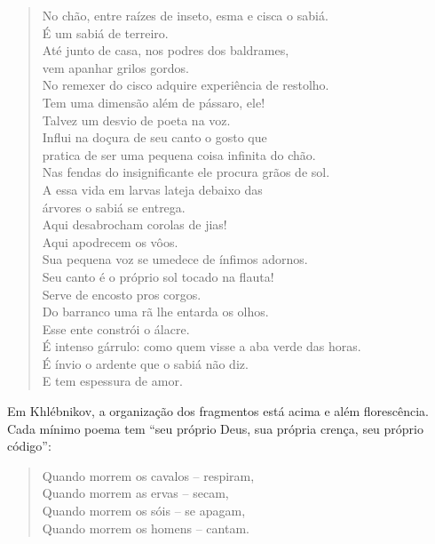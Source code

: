 \begin{verse}
No chão, entre raízes de inseto, esma e cisca \qb{}o sabiá. \\
É um sabiá de terreiro. \\
Até junto de casa, nos podres dos baldrames, \\
vem apanhar grilos gordos. \\
No remexer do cisco adquire experiência de \qb{}restolho. \\
Tem uma dimensão além de pássaro, ele! \\
Talvez um desvio de poeta na voz. \\
Influi na doçura de seu canto o gosto que \\
pratica de ser uma pequena coisa \qb{}infinita do chão. \\
Nas fendas do insignificante ele procura \qb{}grãos de sol. \\
A essa vida em larvas lateja debaixo das \\
árvores o sabiá se entrega. \\
Aqui desabrocham corolas de jias! \\
Aqui apodrecem os vôos. \\
Sua pequena voz se umedece de ínfimos \qb{}adornos. \\
Seu canto é o próprio sol tocado na flauta! \\
Serve de encosto pros corgos. \\
Do barranco uma rã lhe entarda os olhos. \\
Esse ente constrói o álacre. \\
É intenso gárrulo: como quem visse a aba \qb{}verde das horas. \\
É ínvio o ardente que o sabiá não diz. \\
E tem espessura de amor.
\end{verse}

Em Khlébnikov, a organização dos fragmentos está acima e além
florescência. Cada mínimo poema tem ``seu próprio Deus, sua própria
crença, seu próprio código'':

\begin{verse}
Quando morrem os cavalos -- respiram, \\
Quando morrem as ervas -- secam, \\
Quando morrem os sóis -- se apagam, \\
Quando morrem os homens -- cantam.
\end{verse}

